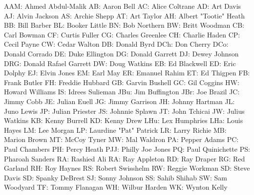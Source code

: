 AAM: Ahmed Abdul-Malik
AB: Aaron Bell
AC: Alice Coltrane
AD: Art Davis
AJ: Alvin Jackson
AS: Archie Shepp
AT: Art Taylor
AH: Albert "Tootie" Heath
BB: Bill Barber
BL: Booker Little
BN: Bob Northern
BW: Britt Woodman
CB: Carl Bowman
CF: Curtis Fuller
CG: Charles Greenlee
CH: Charlie Haden
CP: Cecil Payne
CW: Cedar Walton
DB: Donald Byrd
DCh: Don Cherry
DCo: Donald Corrado
DE: Duke Ellington
DG: Donald Garrett
DJ: Dewey Johnson
DRG: Donald Rafael Garrett
DW: Doug Watkins
EB: Ed Blackwell
ED: Eric Dolphy
EJ: Elvin Jones
EM: Earl May
ER: Emanuel Rahim
ET: Ed Thigpen
FB: Frank Butler
FH: Freddie Hubbard
GB: Garvin Bushell
GC: Gil Coggins
HW: Howard Williams
IS: Idrees Sulieman
JBu: Jim Buffington
JBr: Joe Brazil
JC: Jimmy Cobb
JE: Julian Euell
JG: Jimmy Garrison
JH: Johnny Hartman
JL: Juno Lewis
JP: Julian Priester
JS: Johnnie Splawn
JT: John Tchicai
JW: Julius Watkins
KB: Kenny Burrell
KD: Kenny Drew
LHu: Lex Humphries
LHa: Louis Hayes
LM: Lee Morgan
LP: Laurdine "Pat" Patrick
LR: Larry Richie
MB: Marion Brown
MT: McCoy Tyner
MW: Mal Waldron
PA: Pepper Adams
PC: Paul Chambers
PH: Percy Heath
PJJ: Philly Joe Jones
PQ: Paul Quinichette
PS: Pharoah Sanders
RA: Rashied Ali
RA: Ray Appleton
RD: Ray Draper
RG: Red Garland
RH: Roy Haynes
RS: Robert Swisshelm
RW: Reggie Workman
SD: Steve Davis
SD: Spanky DeBrest
SJ: Sonny Johnson
SS: Sahib Shihab
SW: Sam Woodyard
TF: Tommy Flanagan
WH: Wilbur Harden
WK: Wynton Kelly
